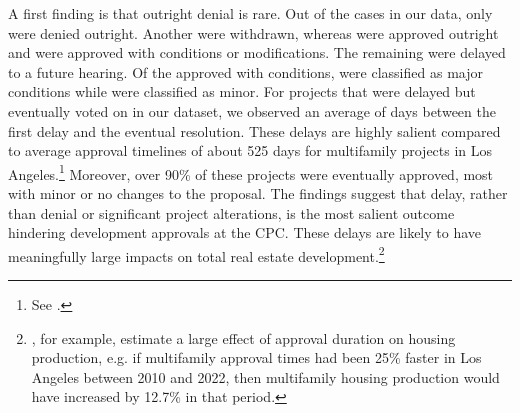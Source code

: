 A first finding is that outright denial is rare. Out of the  cases in our data, only  were denied outright. Another  were withdrawn, whereas  were approved outright and  were approved with conditions or modifications. The remaining  were delayed to a future hearing. Of the  approved with conditions,  were classified as major conditions while  were classified as minor. For projects that were delayed but eventually voted on in our dataset, we observed an average of  days between the first delay and the eventual resolution. These delays are highly salient compared to average approval timelines of about 525 days for multifamily projects in Los Angeles.\footnote{See \citet{gabrielkung2025}.} Moreover, over 90\% of these projects were eventually approved, most with minor or no changes to the proposal. The findings suggest that delay, rather than denial or significant project alterations, is the most salient outcome hindering development approvals at the CPC. These delays are likely to have meaningfully large impacts on total real estate development.\footnote{\citet{gabrielkung2025}, for example, estimate a large effect of approval duration on housing production, e.g. if multifamily approval times had been 25\% faster in Los Angeles between 2010 and 2022, then multifamily housing production would have increased by 12.7\% in that period.}


